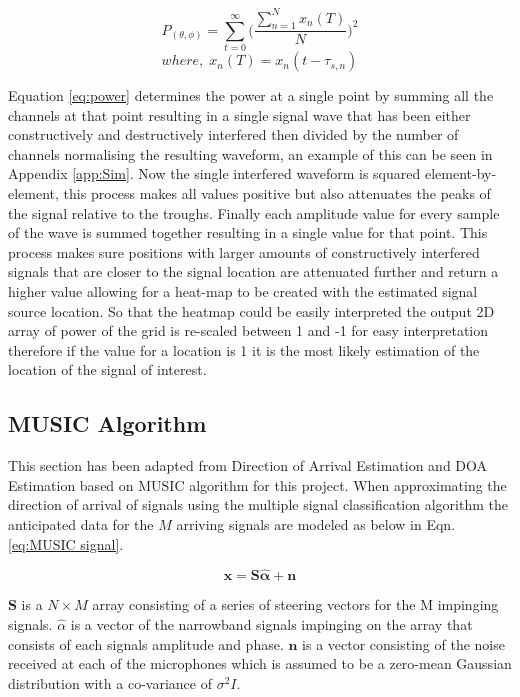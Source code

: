\documentclass{UoNMCHA}
\numberwithin{equation}{section}
\begin{document}
    \begin{equation}
        P_{(\theta, \phi)} = \sum_{t=0}^\infty\Big(\frac{\sum_{n=1}^N x_n(T)}{N}\Big)^2
        \label{eq:power}
    \end{equation}
    \begin{equation*}
        where,\;x_n(T) = x_n(t-\tau_{s,n})
    \end{equation*}
    
    Equation \ref{eq:power} determines the power at a single point by summing all the channels at that point resulting in a single signal wave that has been either constructively and destructively interfered then divided by the number of channels normalising the resulting waveform, an example of this can be seen in Appendix \ref{app:Sim}. Now the single interfered waveform is squared element-by-element, this process makes all values positive but also attenuates the peaks of the signal relative to the troughs. Finally each amplitude value for every sample of the wave is summed together resulting in a single value for that point. This process makes sure positions with larger amounts of constructively interfered signals that are closer to the signal location are attenuated further and return a higher value allowing for a heat-map to be created with the estimated signal source location. So that the heatmap could be easily interpreted the output 2D array of power of the grid is re-scaled between 1 and -1 for easy interpretation therefore if the value for a location is 1 it is the most likely estimation of the location of the signal of interest.
    
\subsection{MUSIC Algorithm} \label{sec:Software MUSIC}
    This section has been adapted from Direction of Arrival Estimation \citep{Adv13} and DOA Estimation based on MUSIC algorithm \citep{Tan14} for this project. When approximating the direction of arrival of signals using the multiple signal classification algorithm the anticipated data for the $M$ arriving signals are modeled as below in Eqn. \ref{eq:MUSIC signal}.
    
    \begin{equation}
        \mathbf{x}=\mathbf{S\hat{\alpha}} + \mathbf{n}
        \label{eq:MUSIC signal}
    \end{equation}

    $\mathbf{S}$ is a $N \times M$ array consisting of a series of steering vectors for the M impinging signals. $\hat{\alpha}$ is a vector of the narrowband signals impinging on the array that consists of each signals amplitude and phase. $\mathbf{n}$ is a vector consisting of the noise received at each of the microphones which is assumed to be a zero-mean Gaussian distribution with a co-variance of $\sigma^2I$.
\end{document}
